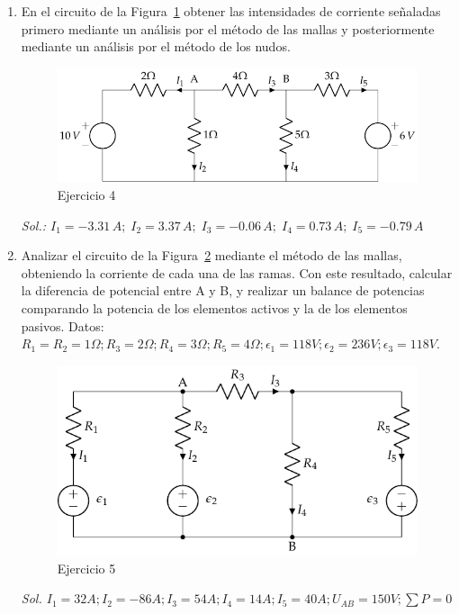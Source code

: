 \begin{enumerate}
		\item En el circuito de la Figura~\ref{fig.ejercicio8-bt1} obtener las intensidades de corriente señaladas primero mediante un análisis por el método de las mallas y posteriormente mediante un análisis por el método de los nudos.
 \begin{figure}[H]
 		\centering
\includegraphics{../figs/ej8_BT1.pdf}
 		\caption{Ejercicio 4}
 		\label{fig.ejercicio8-bt1}
 	\end{figure}
 	\emph{Sol.: $I_1=-3.31\,A;\;I_2=3.37\,{A};\; I_3=-0.06\,{A};\; I_4=0.73\,{A};\; I_5=-0.79\,A$}
 	
 	\item Analizar el circuito de la Figura~\ref{fig.mallas2} mediante el método de las mallas, obteniendo la corriente de cada una de las ramas. Con este resultado, calcular la diferencia de potencial entre A y B, y realizar un balance de potencias comparando la potencia de los elementos activos y la de los elementos pasivos. Datos: $R_1 = R_2 = {1}\Omega; R_3 = {2}\Omega; R_4 = {3}\Omega; R_5={4}\Omega; \epsilon_1={118} V; \epsilon_2 = 236V; \epsilon_3 = {118}V$.\\
 	\begin{figure}[H]
 	    \centering
 	    \includegraphics{../figs/mallas2.pdf}
 	    \caption{Ejercicio 5}
 	    \label{fig.mallas2}
 	\end{figure}
 	\emph{Sol. $I_1 = {32}A; I_2 = {-86} A; I_3 ={54}A; I_4 = {14}A; I_5 = {40}A; U_{AB}=150V; \sum P=0$}
 	

\end{enumerate}
